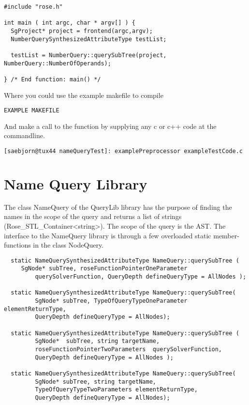{\begin{verbatim}
#include "rose.h"

int main ( int argc, char * argv[] ) {
  SgProject* project = frontend(argc,argv);
  NumberQuerySynthesizedAttributeType testList;
  
  testList = NumberQuery::querySubTree(project, NumberQuery::NumberOfOperands);

} /* End function: main() */
\end{verbatim}
Where you could use the example makefile to compile
\begin{verbatim}
EXAMPLE MAKEFILE
\end{verbatim}
And make a call to the function by supplying any c or c++ code at the commandline.
\begin{verbatim}
[saebjorn@tux44 nameQueryTest]: examplePreprocessor exampleTestCode.c
\end{verbatim}


 
\section{Name Query Library}

The class NameQuery of the QueryLib library has the purpose of
finding the names in the scope of the query and returns a list of
strings (Rose\_STL\_Container<string>). The scope of the query is
the AST. The interface to the NameQuery library is through a few
overloaded static member-functions in the class NodeQuery.

\begin{verbatim}
  static NameQuerySynthesizedAttributeType NameQuery::querySubTree (
	 SgNode* subTree, roseFunctionPointerOneParameter 
         querySolverFunction, QueryDepth defineQueryType = AllNodes );

  static NameQuerySynthesizedAttributeType NameQuery::querySubTree( 
         SgNode* subTree, TypeOfQueryTypeOneParameter elementReturnType,
         QueryDepth defineQueryType = AllNodes);
	 	
  static NameQuerySynthesizedAttributeType NameQuery::querySubTree (
         SgNode*  subTree, string targetName,
         roseFunctionPointerTwoParameters  querySolverFunction,
         QueryDepth defineQueryType = AllNodes );
	  
  static NameQuerySynthesizedAttributeType NameQuery::querySubTree( 
         SgNode* subTree, string targetName, 
         TypeOfQueryTypeTwoParameters elementReturnType,
         QueryDepth defineQueryType = AllNodes);	  
\end{verbatim}  


}
